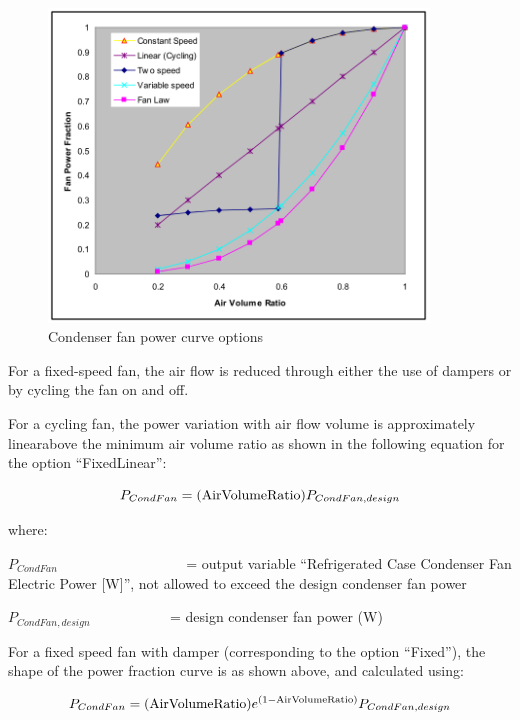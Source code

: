 \begin{figure}[hbtp] %
\centering
\includegraphics[width=0.9\textwidth, height=0.9\textheight, keepaspectratio=true]{media/image6291.svg.png}
\caption{Condenser fan power curve options \protect \label{fig:condenser-fan-power-curve-options}}
\end{figure}

For a fixed-speed fan, the air flow is reduced through either the use of dampers or by cycling the fan on and off.

For a cycling fan, the power variation with air flow volume is approximately linearabove the minimum air volume ratio as shown in the following equation for the option ``FixedLinear'':

\begin{equation}
{P_{CondFan}} = ({\rm{Air Volume Ratio}}){P_{CondFan,design}}
\end{equation}

where:

\({P_{CondFan}}\) ~~~~~~~~~~~~~~~~~ = output variable ``Refrigerated Case Condenser Fan Electric Power {[}W{]}'', not allowed to exceed the design condenser fan power

\({P_{CondFan,design}}\) ~~~~~~~~~~ = design condenser fan power (W)

For a fixed speed fan with damper (corresponding to the option ``Fixed''), the shape of the power fraction curve is as shown above, and calculated using:

\begin{equation}
{P_{CondFan}} = ({\rm{Air Volume Ratio}}){e^{(1 - {\rm{Air Volume Ratio}})}}{P_{CondFan,design}}
\end{equation}

